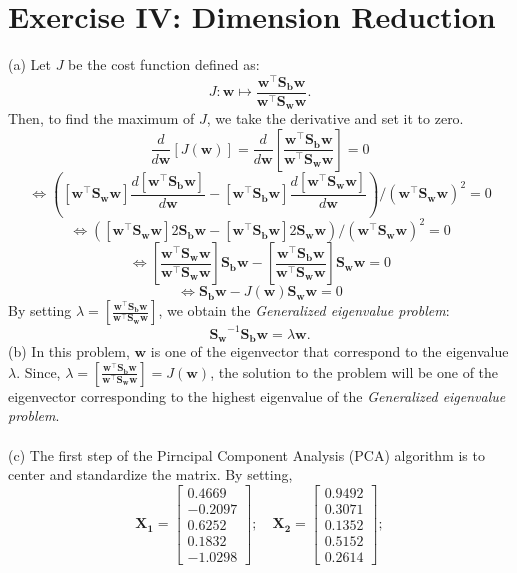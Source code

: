 \section*{Exercise IV: Dimension Reduction}

(a) Let $J$ be the cost function defined as:
\[
    J: \mathbf{w} \mapsto \frac{\mathbf{w}^{\top} \mathbf{S_b} \mathbf{w}}{\mathbf{w}^{\top} \mathbf{S_w} \mathbf{w}}.
\]
Then, to find the maximum of $J$, we take the derivative and set it to zero.
\[
    \frac{d}{d \mathbf{w}}[J(\mathbf{w})]= \frac{d}{d\mathbf{w}}\left[ \frac{\mathbf{w}^{\top} \mathbf{S_b} \mathbf{w}}{\mathbf{w}^{\top}\mathbf{S_w}\mathbf{w}}\right] =0
\]
\[
    \iff \left(\left[\mathbf{w}^{\top} \mathbf{S_w} \mathbf{w}\right] \frac{d\left[\mathbf{w}^{\top} \mathbf{S_b} \mathbf{w}\right]}{d \mathbf{w}}-\left[\mathbf{w}^{\top} \mathbf{S_b} \mathbf{w} \right] \frac{d\left[\mathbf{w}^{\top} \mathbf{S_w} \mathbf{w}\right]}{d \mathbf{w}}\right) /\left(\mathbf{w}^{\top} \mathbf{S_w} \mathbf{w}\right)^2=0 
\]
\[
    \iff \left(\left[\mathbf{w}^{\top} \mathbf{S_w} \mathbf{w}\right] 2 \mathbf{S_b} \mathbf{w}-\left[\mathbf{w}^{\top} \mathbf{S_b} \mathbf{w}\right] 2 \mathbf{S_w} \mathbf{w}\right) /\left(\mathbf{w}^{\top} \mathbf{S_w} \mathbf{w}\right)^2=0
\]
\[
\iff \left[\frac{\mathbf{w}^{\top} \mathbf{S_w} \mathbf{w}}{\mathbf{w}^{\top} \mathbf{S_w} \mathbf{w}}\right] \mathbf{S_b} \mathbf{w}-\left[\frac{\mathbf{w}^{\top} \mathbf{S_b} \mathbf{w}}{\mathbf{w}^{\top} \mathbf{S_w} \mathbf{w}}\right] \mathbf{S_w} \mathbf{w} =0 
\]
\[
\iff \mathbf{S_b} \mathbf{w} - J(\mathbf{w}) \mathbf{S_w} \mathbf{w} = 0
\]
By setting $\lambda = \displaystyle \left[\frac{\mathbf{w}^{\top} \mathbf{S_b} \mathbf{w}}{\mathbf{w}^{\top} \mathbf{S_w} \mathbf{w}}\right]$, we obtain the \textit{Generalized eigenvalue problem}:
\[
\boxed{
    \mathbf{S_w}^{-1} \mathbf{S_b} \mathbf{w} = \lambda \mathbf{w}.
}
\]
(b) In this problem, $\mathbf{w}$ is one of the eigenvector that correspond to the eigenvalue $\lambda$. Since, $\lambda = \displaystyle \left[\frac{\mathbf{w}^{\top} \mathbf{S_b} \mathbf{w}}{\mathbf{w}^{\top} \mathbf{S_w} \mathbf{w}}\right] = J(\mathbf{w})$, the solution to the problem will be one of the eigenvector corresponding to the highest eigenvalue of the \textit{Generalized eigenvalue problem}.\\ \\ 
(c) The first step of the Pirncipal Component Analysis (PCA) algorithm is to center and standardize the matrix. By setting,
\[
\mathbf{X_1} = \begin{bmatrix}
 0.4669 \\
 −0.2097 \\
 0.6252 \\
  0.1832 \\
  −1.0298
\end{bmatrix}; \quad
\mathbf{X_2} = \begin{bmatrix}
 0.9492 \\
 0.3071 \\
 0.1352 \\
  0.5152 \\
  0.2614
\end{bmatrix};
\]
